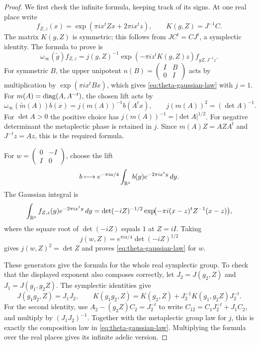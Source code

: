 \begin{proof}
We first check the infinite formula, keeping track of its signs.
At one real place write
\[
 f_{Z,z}(x)=\exp(\pi ix^tZx+2\pi ix^tz),\qquad K(g,Z)=J^{-1}C.
\]
The matrix \(K(g,Z)\) is symmetric; this follows from
\(JC^t=CJ^t\), a symplectic identity.  The formula to prove is
\begin{equation}\label{eq:theta-gaussian-law}
 \omega_\infty(\widetilde g)f_{Z,z}
  =j(g,Z)^{-1}\exp(-\pi iz^tK(g,Z)z)
       f_{gZ,J^{-t}z}.
\end{equation}
For symmetric \(B\), the upper unipotent
\(n(B)=\left(\begin{smallmatrix}I&B\\0&I\end{smallmatrix}\right)\)
acts by multiplication by \(\exp(\pi ix^tBx)\), which gives
\eqref{eq:theta-gaussian-law} with \(j=1\).  For
\(m(A)=\operatorname{diag}(A,A^{-t})\), the chosen lift acts by
\[
 \omega_\infty(\widetilde m(A))b(x)
       =j(m(A))^{-1}b(A^tx),\qquad
 j(m(A))^2=(\det A)^{-1}.
\]
For \(\det A>0\) the positive choice has
\(j(m(A))^{-1}=|\det A|^{1/2}\).  For negative determinant
the metaplectic phase is retained in \(j\).  Since
\(m(A)Z=AZA^t\) and \(J^{-t}z=Az\), this is the required formula.

For
\(w=\left(\begin{smallmatrix}0&-I\\I&0\end{smallmatrix}\right)\),
choose the lift
\[
 b\longmapsto e^{-\pi ia/4}
        \int_{\mathbb{R}^a}b(y)e^{-2\pi ix^ty}\,dy.
\]
The Gaussian integral is
\[
 \int_{\mathbb{R}^a}f_{Z,z}(y)e^{-2\pi ix^ty}\,dy
  =\det(-iZ)^{-1/2}
       \exp\!\bigl(-\pi i(x-z)^tZ^{-1}(x-z)\bigr),
\]
where the square root of \(\det(-iZ)\) equals \(1\) at \(Z=iI\).
Taking
\[
 j(w,Z)=e^{\pi ia/4}\det(-iZ)^{1/2}
\]
gives \(j(w,Z)^2=\det Z\) and proves
\eqref{eq:theta-gaussian-law} for \(w\).

These generators give the formula for the whole real symplectic
group.  To check that the displayed exponent also composes
correctly, let \(J_2=J(g_2,Z)\) and
\(J_1=J(g_1,g_2Z)\).  The symplectic identities give
\[
 J(g_1g_2,Z)=J_1J_2,\qquad
 K(g_1g_2,Z)=K(g_2,Z)+J_2^{-1}K(g_1,g_2Z)J_2^{-t}.
\]
For the second identity, use
\(A_2-(g_2Z)C_2=J_2^{-t}\) to write
\(C_{12}=C_1J_2^{-t}+J_1C_2\), and multiply by
\((J_1J_2)^{-1}\).  Together with the metaplectic group law for
\(j\), this is exactly the composition law in
\eqref{eq:theta-gaussian-law}.  Multiplying the formula over the
real places gives its infinite adelic version.


\end{proof}
